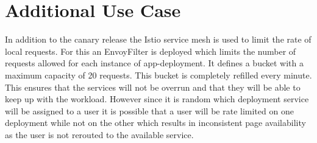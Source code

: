 
\section{Additional Use Case}
In addition to the canary release the Istio service mesh is used to limit the rate of local requests. For this an EnvoyFilter is deployed which limits the number of requests allowed for each instance of app-deployment. It defines a bucket with a maximum capacity of 20 requests. This bucket is completely refilled every minute. This ensures that the services will not be overrun and that they will be able to keep up with the workload. However since it is random which deployment service will be assigned to a user it is possible that a user will be rate limited on one deployment while not on the other which results in inconsistent page availability as the user is not rerouted to the available service.